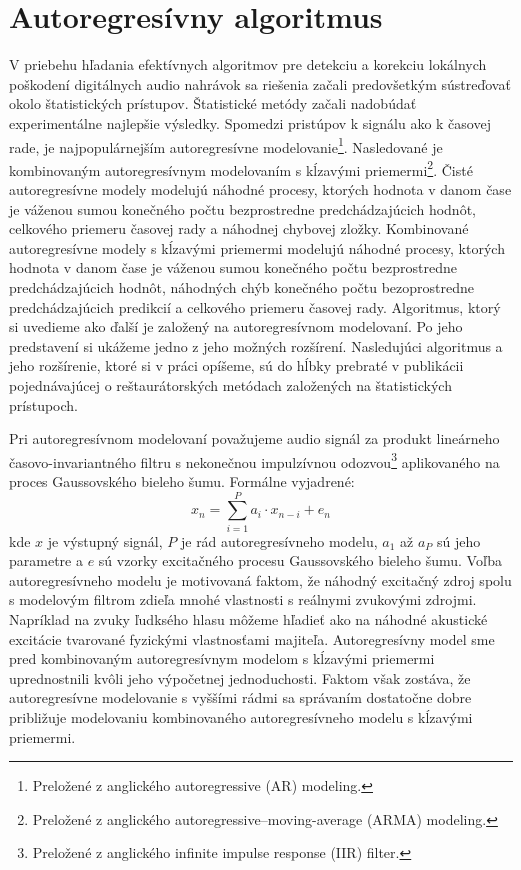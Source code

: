 \section{Autoregresívny algoritmus}
V priebehu hľadania efektívnych algoritmov pre detekciu a korekciu lokálnych poškodení digitálnych audio nahrávok sa riešenia začali predovšetkým sústreďovať okolo štatistických prístupov. Štatistické metódy začali nadobúdať experimentálne najlepšie výsledky. Spomedzi pristúpov k signálu ako k časovej rade, je najpopulárnejším autoregresívne modelovanie\footnote{Preložené z anglického autoregressive (AR) modeling.}. Nasledované je kombinovaným autoregresívnym modelovaním s kĺzavými priemermi\footnote{Preložené z anglického autoregressive–moving-average (ARMA) modeling.}. Čisté autoregresívne modely modelujú náhodné procesy, ktorých hodnota v danom čase je váženou sumou konečného počtu bezprostredne predchádzajúcich hodnôt, celkového priemeru časovej rady a náhodnej chybovej zložky. Kombinované autoregresívne modely s kĺzavými priemermi modelujú náhodné procesy, ktorých hodnota v danom čase je váženou sumou konečného počtu bezprostredne predchádzajúcich hodnôt, náhodných chýb konečného počtu bezoprostredne predchádzajúcich predikcií a celkového priemeru časovej rady. Algoritmus, ktorý si uvedieme ako ďalší je založený na autoregresívnom modelovaní. Po jeho predstavení si ukážeme jedno z jeho možných rozšírení. Nasledujúci algoritmus a jeho rozšírenie, ktoré si v práci opíšeme, sú do hĺbky prebraté v publikácii \cite{Godsill} pojednávajúcej o reštaurátorských metódach založených na štatistických prístupoch.

Pri autoregresívnom modelovaní považujeme audio signál za produkt lineárneho časovo-invariantného filtru s nekonečnou impulzívnou odozvou\footnote{Preložené z anglického infinite impulse response (IIR) filter.} aplikovaného na proces Gaussovského bieleho šumu. Formálne vyjadrené:
$$x_n = \sum_{i=1}^P a_i \cdot x_{n-i}+e_n$$ 
kde $x$ je výstupný signál, $P$ je rád autoregresívneho modelu, $a_1$ až $a_P$ sú jeho parametre a $e$ sú vzorky excitačného procesu Gaussovského bieleho šumu. Voľba autoregresívneho modelu je motivovaná faktom, že náhodný excitačný zdroj spolu s modelovým filtrom zdieľa mnohé vlastnosti s reálnymi zvukovými zdrojmi. Napríklad na zvuky ľudksého hlasu môžeme hľadieť ako na náhodné akustické excitácie tvarované fyzickými vlastnosťami majiteľa. Autoregresívny model sme pred kombinovaným autoregresívnym modelom s kĺzavými priemermi uprednostnili kvôli jeho výpočetnej jednoduchosti. Faktom však zostáva, že autoregresívne modelovanie s vyššími rádmi sa správaním dostatočne dobre približuje modelovaniu kombinovaného autoregresívneho modelu s kĺzavými priemermi. 

